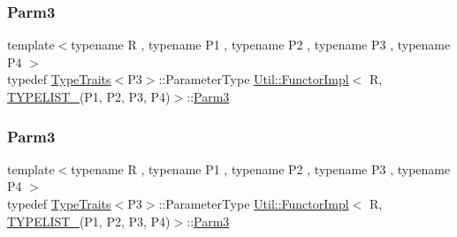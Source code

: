 \subsubsection{\texorpdfstring{Parm3}{Parm3}\hspace{0.1cm}{\footnotesize\ttfamily [1/3]}}
{\footnotesize\ttfamily template$<$typename R , typename P1 , typename P2 , typename P3 , typename P4 $>$ \\
typedef \mbox{\hyperlink{classUtil_1_1TypeTraits}{Type\+Traits}}$<$P3$>$\+::Parameter\+Type \mbox{\hyperlink{classUtil_1_1FunctorImpl}{Util\+::\+Functor\+Impl}}$<$ R, \mbox{\hyperlink{adat__devel__install_2include_2adat_2typelist_8h_a7a156c571ab21a16b0495e1c882a07fa}{T\+Y\+P\+E\+L\+I\+S\+T\+\_}}(P1, P2, P3, P4)$>$\+::\mbox{\hyperlink{structUtil_1_1Private_1_1FunctorImplBase_a052148e627fd4caecbcffdbdf1033dbb}{Parm3}}}

\mbox{\label{classUtil_1_1FunctorImpl_3_01R_00_01TYPELIST__4_07P1_00_01P2_00_01P3_00_01P4_08_4_a50b605c92c54da7770a000867a97287a}} 
\subsubsection{\texorpdfstring{Parm3}{Parm3}\hspace{0.1cm}{\footnotesize\ttfamily [2/3]}}
{\footnotesize\ttfamily template$<$typename R , typename P1 , typename P2 , typename P3 , typename P4 $>$ \\
typedef \mbox{\hyperlink{classUtil_1_1TypeTraits}{Type\+Traits}}$<$P3$>$\+::Parameter\+Type \mbox{\hyperlink{classUtil_1_1FunctorImpl}{Util\+::\+Functor\+Impl}}$<$ R, \mbox{\hyperlink{adat__devel__install_2include_2adat_2typelist_8h_a7a156c571ab21a16b0495e1c882a07fa}{T\+Y\+P\+E\+L\+I\+S\+T\+\_}}(P1, P2, P3, P4)$>$\+::\mbox{\hyperlink{structUtil_1_1Private_1_1FunctorImplBase_a052148e627fd4caecbcffdbdf1033dbb}{Parm3}}}

\mbox{\label{classUtil_1_1FunctorImpl_3_01R_00_01TYPELIST__4_07P1_00_01P2_00_01P3_00_01P4_08_4_a50b605c92c54da7770a000867a97287a}} 
